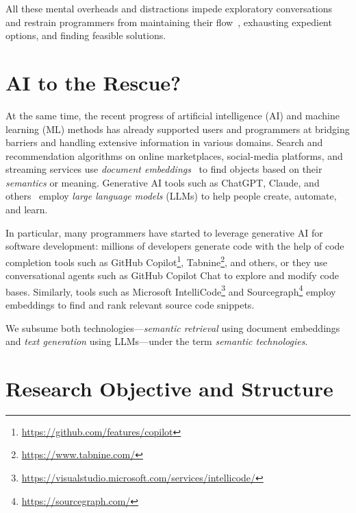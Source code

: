 All these mental overheads and distractions impede exploratory conversations and restrain programmers from maintaining their flow~\cite{csikszentmihalyi2008flow}, exhausting expedient options, and finding feasible solutions.

\section*{AI to the Rescue?}

At the same time, the recent progress of artificial intelligence (AI) and machine learning (ML) methods has already supported users and programmers at bridging barriers and handling extensive information in various domains.
Search and recommendation algorithms on online marketplaces, social-media platforms, and streaming services use \emph{document embeddings}~\cite{mikolov2013efficient,devlin2019bert} to find objects based on their \emph{semantics} or meaning.
Generative AI tools such as ChatGPT\footnotemark, Claude\footnotemark, and others~\cite{vaswani2017attention,radford2018improving,zhao2023survey} employ \emph{large language models} (LLMs) to help people create, automate, and learn.


In particular, many programmers have started to leverage generative AI for software development: millions of developers generate code with the help of code completion tools such as GitHub Copilot\footnote{\url{https://github.com/features/copilot}}, Tabnine\footnote{\url{https://www.tabnine.com/}}, and others, or they use conversational agents such as GitHub Copilot Chat %
to explore and modify code bases.
Similarly, tools such as Microsoft IntelliCode\footnote{\url{https://visualstudio.microsoft.com/services/intellicode/}} and Sourcegraph\footnote{\url{https://sourcegraph.com/}} employ embeddings to find and rank relevant source code snippets.

We subsume both technologies---\emph{semantic retrieval} using document embeddings and \emph{text generation} using LLMs---under the term \emph{semantic technologies}.

\section*{Research Objective and Structure}

